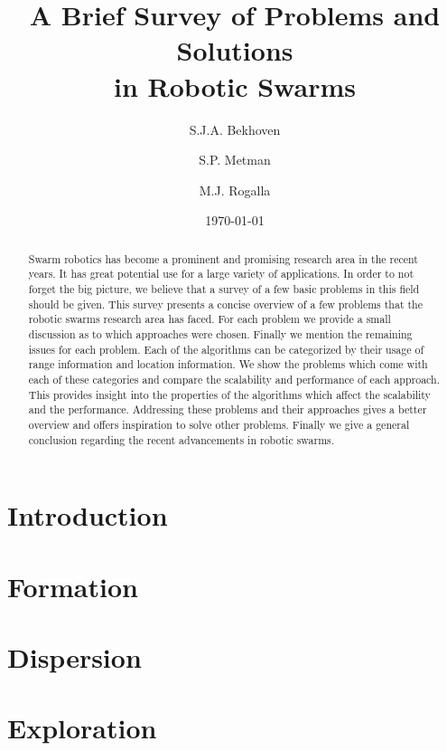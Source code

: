 \documentclass[a4paper]{article}
\title{A Brief Survey of Problems and Solutions \\ in Robotic Swarms}
\author{S.J.A. Bekhoven  \and
    S.P. Metman \and
    M.J. Rogalla}
\date{\today}
\begin{document}
\maketitle

\begin{abstract}
Swarm robotics has become a prominent and promising research area in the recent years. 
It has great potential use for a large variety of applications. 
In order to not forget the big picture, we believe that a survey of a few basic problems in this field should be given. 
This survey presents a concise overview of a few problems that the robotic swarms research area has faced. For each problem we provide a small discussion as to which approaches were chosen. 
Finally we mention the remaining issues for each problem. 
Each of the algorithms can be categorized by their usage of range information and location information. 
We show the problems which come with each of these categories and compare the scalability and performance of each approach. 
This provides insight into the properties of the algorithms which affect the scalability and the performance. 
Addressing these problems and their approaches gives a better overview and offers inspiration to solve other problems.
Finally we give a general conclusion regarding the recent advancements in robotic swarms.
\end{abstract}


\section{Introduction}
  

\section{Formation}
  \label{sec:Formation}
  

\section{Dispersion}
  \label{sec:Dispersion}
  

\section{Exploration}
  \label{sec:Exploration}
  
\end{document}
